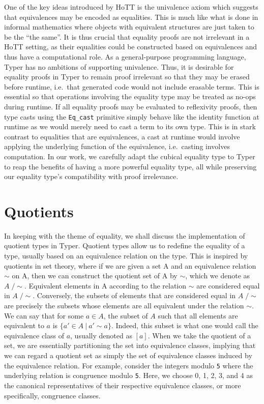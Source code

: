 \documentclass[12pt,twoside,maitrise]{dms}
\theoremstyle{definition}
\numberwithin{equation}{section}
\numberwithin{table}{chapter}
\numberwithin{figure}{chapter}
\newcommand\id[1] {\texttt{#1}}
\newcommand\fn[1] {\texttt{#1}}
\begin{document}
One of the key ideas introduced by HoTT is the univalence axiom which suggests
that equivalences may be encoded as equalities. This is much like what is done
in informal mathematics where objects with equivalent structures are just taken
to be the ``the same''. It is thus crucial that equality proofs are not
irrelevant in a HoTT setting, as their equalities could be constructed based on
equivalences and thus have a computational role. As a general-purpose
programming language, Typer has no ambitions of supporting univalence. Thus, it
is desirable for equality proofs in Typer to remain proof irrelevant so that
they may be erased before runtime, i.e.\ that generated code would not include
erasable terms. This is essential so that operations involving the equality
type may be treated as no-ops during runtime. If all equality proofs may be
evaluated to reflexivity proofs, then type casts using the \fn{Eq\_cast}
primitive simply behave like the identity function at runtime as we would merely
need to cast a term to its own type. This is in stark contrast to equalities
that are equivalences, a cast at runtime would involve applying the underlying
function of the equivalence, i.e.\ casting involves computation. In our work, we
carefully adapt the cubical equality type to Typer to reap the benefits of
having a more powerful equality type, all while preserving our equality type's
compatibility with proof irrelevance.

\section{Quotients}

In keeping with the theme of equality, we shall discuss the implementation of
quotient types in Typer. Quotient types allow us to redefine the equality of a
type, usually based on an equivalence relation on the type. This is inspired by
quotients in set theory, where if we are given a set A and an equivalence
relation $\sim$ on A, then we can construct the quotient set of A by $\sim$,
which we denote as $A\; / \sim$. Equivalent elements in A according to the
relation $\sim$ are considered equal in $A\; / \sim$. Conversely, the subsets of
elements that are considered equal in $A\; / \sim$ are precisely the subsets
whose elements are all equivalent under the relation $\sim$. We can say that for
some $a \in A$, the subset of $A$ such that all elements are equivalent to $a$
is $\{a' \in A \ | \ a' \sim a \}$. Indeed, this subset is what one would call
the equivalence class of $a$, usually denoted as $[a]$. When we take the
quotient of a set, we are essentially partitioning the set into equivalence
classes, implying that we can regard a quotient set as simply the set of
equivalence classes induced by the equivalence relation. For example, consider
the integers modulo \id{5} where the underlying relation is congruence modulo
\id{5}. Here, we choose 0, 1, 2, 3, and 4 as the canonical representatives of
their respective equivalence classes, or more specifically, congruence classes.
\end{document}
